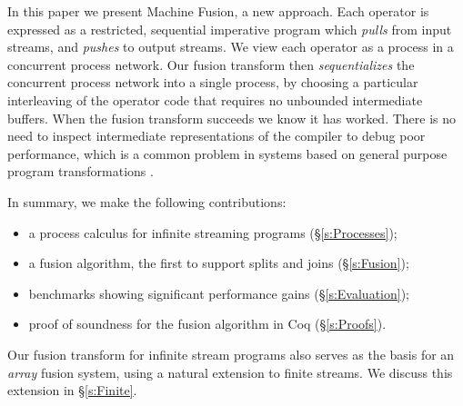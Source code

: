 
In this paper we present Machine Fusion, a new approach. Each operator is expressed as a restricted, sequential imperative program which \emph{pulls} from input streams, and \emph{pushes} to output streams. We view each operator as a process in a concurrent process network. Our fusion transform then \emph{sequentializes} the concurrent process network into a single process, by choosing a particular interleaving of the operator code that requires no unbounded intermediate buffers. When the fusion transform succeeds we know it has worked. There is no need to inspect intermediate representations of the compiler to debug poor performance, which is a common problem in systems based on general purpose program transformations \cite{lippmeier2012:guiding}.

In summary, we make the following contributions:
\begin{itemize}
\item a process calculus for infinite streaming programs (\S\ref{s:Processes});
\item a fusion algorithm, the first to support splits and joins (\S\ref{s:Fusion});
\item benchmarks showing significant performance gains (\S\ref{s:Evaluation});
\item proof of soundness for the fusion algorithm in Coq (\S\ref{s:Proofs}).
\end{itemize}

Our fusion transform for infinite stream programs also serves as the basis for an \emph{array} fusion system, using a natural extension to finite streams. We discuss this extension in \S\ref{s:Finite}.

